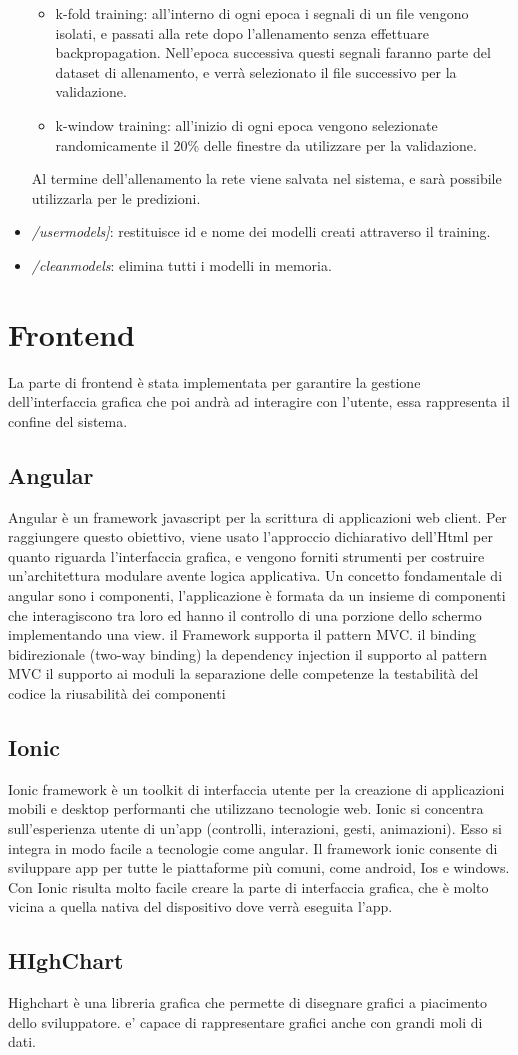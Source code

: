 \documentclass{article}
\begin{document}
\begin{itemize}
\begin{itemize}
	\item k-fold training: all'interno di ogni epoca i segnali di un file vengono isolati, e passati alla rete dopo l'allenamento senza 	effettuare backpropagation. Nell'epoca successiva questi segnali faranno parte del dataset di allenamento, e verrà selezionato il file successivo per la validazione.
	\item k-window training: all'inizio di ogni epoca vengono selezionate randomicamente il 20\% delle finestre da utilizzare per la validazione.
\end{itemize}
Al termine dell'allenamento la rete viene salvata nel sistema, e sarà possibile utilizzarla per le predizioni. 
\item \textit{/usermodels]}: restituisce id e nome dei modelli creati attraverso il training. 
\item \textit{/cleanmodels}: elimina tutti i modelli in memoria. 
\end{itemize}


\section{Frontend}
La parte di frontend è stata implementata per garantire la gestione dell'interfaccia grafica che poi andrà ad interagire con l'utente, essa rappresenta il confine del sistema.

\subsection{Angular}
Angular è un framework javascript  per la scrittura di applicazioni web  client. Per raggiungere questo obiettivo, viene usato l'approccio dichiarativo dell'Html per quanto riguarda l'interfaccia grafica, e vengono forniti strumenti per costruire un'architettura modulare avente logica applicativa.
Un concetto fondamentale di angular sono i componenti, l'applicazione è formata da un insieme di componenti che interagiscono tra loro ed  hanno il controllo di una porzione dello schermo implementando una view.
il Framework supporta il pattern MVC.
il binding bidirezionale (two-way binding)
la dependency injection
il supporto al pattern MVC
il supporto ai moduli
la separazione delle competenze
la testabilità del codice
la riusabilità dei componenti
\subsection{Ionic}
Ionic framework è un toolkit  di interfaccia utente per la creazione di  applicazioni mobili e desktop performanti che utilizzano tecnologie web.
Ionic si concentra sull'esperienza utente di un'app (controlli, interazioni, gesti, animazioni). Esso si integra in modo facile a tecnologie come angular.
Il framework ionic consente di sviluppare app per tutte le piattaforme più comuni, come android, Ios e windows. Con Ionic risulta molto facile creare la parte di interfaccia grafica, che è molto vicina a quella nativa del dispositivo dove verrà eseguita l'app.
\subsection{HIghChart}
Highchart è una libreria grafica che permette di disegnare grafici a piacimento dello sviluppatore. e' capace di rappresentare grafici anche con grandi moli di dati.
\nocite{*}
\printbibliography[heading = bibintoc]
\end{document}
